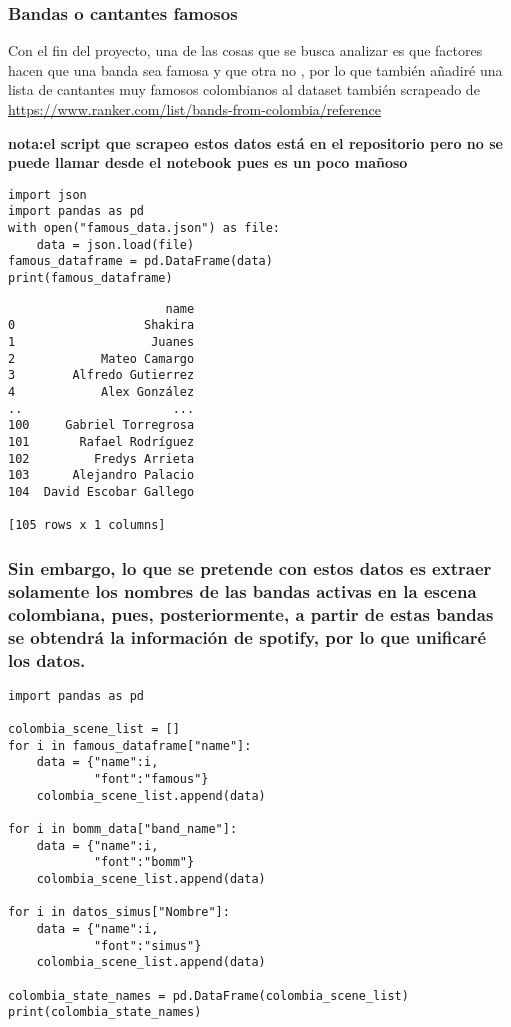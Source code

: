 \documentclass[11pt]{article}
\begin{document}
\subsubsection{Bandas o cantantes famosos}
\label{sec:org14f8a5f}
Con el fin del proyecto, una de las cosas que se busca analizar es que factores hacen que una banda sea famosa y que otra no , por lo que también añadiré una lista de cantantes muy famosos colombianos al dataset también scrapeado de \url{https://www.ranker.com/list/bands-from-colombia/reference}

\textbf{nota:el script que scrapeo estos datos está en el repositorio pero no se puede llamar desde el notebook pues es un poco mañoso}

\begin{verbatim}
import json
import pandas as pd
with open("famous_data.json") as file:
    data = json.load(file)
famous_dataframe = pd.DataFrame(data)
print(famous_dataframe)
\end{verbatim}

\begin{verbatim}
                      name
0                  Shakira
1                   Juanes
2            Mateo Camargo
3        Alfredo Gutierrez
4            Alex González
..                     ...
100     Gabriel Torregrosa
101       Rafael Rodríguez
102         Fredys Arrieta
103      Alejandro Palacio
104  David Escobar Gallego

[105 rows x 1 columns]
\end{verbatim}

\subsubsection{Sin embargo, lo que se pretende con estos datos es extraer solamente los nombres de las bandas activas en la escena colombiana, pues, posteriormente, a partir de estas bandas se obtendrá la información de spotify, por lo que unificaré los datos.}
\label{sec:org0d35cac}

\begin{verbatim}
import pandas as pd

colombia_scene_list = []
for i in famous_dataframe["name"]:
    data = {"name":i,
            "font":"famous"}
    colombia_scene_list.append(data)

for i in bomm_data["band_name"]:
    data = {"name":i,
            "font":"bomm"}
    colombia_scene_list.append(data)

for i in datos_simus["Nombre"]:
    data = {"name":i,
            "font":"simus"}
    colombia_scene_list.append(data)

colombia_state_names = pd.DataFrame(colombia_scene_list)
print(colombia_state_names)

\end{verbatim}
\end{document}
